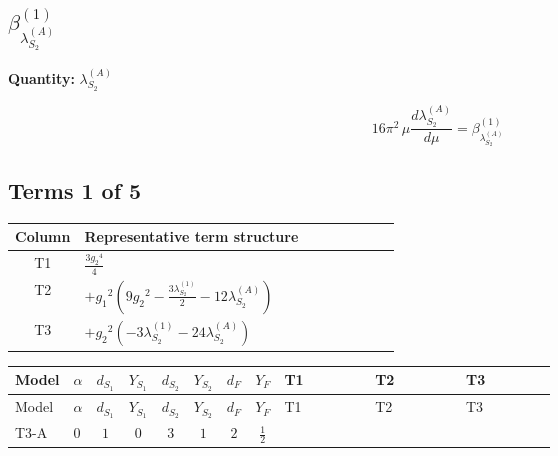 \documentclass[8pt]{article}
\begin{document}
\begin{landscape}
\section*{$\beta_{\lambda_{S_2}^{(A)}}^{(1)}$}
\noindent\textbf{Quantity: }$\lambda_{S_2}^{(A)}$\par\smallskip
\[16\pi^2\,\mu\frac{d \lambda_{S_2}^{(A)}}{d\mu}=\beta_{\lambda_{S_2}^{(A)}}^{(1)}\]
\subsection*{Terms 1 of 5}
\begin{center}
\begin{tabular}{@{}c >{\raggedright\arraybackslash}p{0.82\linewidth}@{}}
\toprule
Column & Representative term structure \\
\midrule
T1 & \(\displaystyle \frac{3 {g_2}^4}{4}\) \\
\midrule
T2 & \(\displaystyle +{g_1}^2 \left(9 {g_2}^2-\frac{3 {\lambda_{S_2}^{(1)}}}{2}-12 {\lambda_{S_2}^{(A)}}\right)\) \\
\midrule
T3 & \(\displaystyle +{g_2}^2 (-3 {\lambda_{S_2}^{(1)}}-24 {\lambda_{S_2}^{(A)}})\) \\
\midrule
\bottomrule
\end{tabular}
\end{center}
\smallskip
\tiny
\begin{longtable}{@{}llcccccc >{\raggedright\arraybackslash}p{0.21\linewidth} >{\raggedright\arraybackslash}p{0.21\linewidth} >{\raggedright\arraybackslash}p{0.21\linewidth}@{}}
\toprule
Model & $\alpha$ & $d_{S_1}$ & $Y_{S_1}$ & $d_{S_2}$ & $Y_{S_2}$ & $d_F$ & $Y_F$ & T1 & T2 & T3 \\
\midrule
\endfirsthead
\toprule
Model & $\alpha$ & $d_{S_1}$ & $Y_{S_1}$ & $d_{S_2}$ & $Y_{S_2}$ & $d_F$ & $Y_F$ & T1 & T2 & T3 \\
\midrule
\endhead
T3-A & $0$ & $1$ & $0$ & $3$ & $1$ & $2$ & $\frac{1}{2}$ & \scriptsize\adjustbox{max width=\linewidth}{$\begin{gathered} \frac{3 {g_2}^4}{4}\end{gathered}$} & \scriptsize\adjustbox{max width=\linewidth}{$\begin{gathered} +{g_1}^2 \left(9 {g_2}^2-\frac{3 {\lambda_{S_2}^{(1)}}}{2}-12 {\lambda_{S_2}^{(A)}}\right)\end{gathered}$} & \scriptsize\adjustbox{max width=\linewidth}{$\begin{gathered} +{g_2}^2 (-3 {\lambda_{S_2}^{(1)}}-24 {\lambda_{S_2}^{(A)}})\end{gathered}$} \\

\end{longtable}
\end{landscape}
\end{document}
